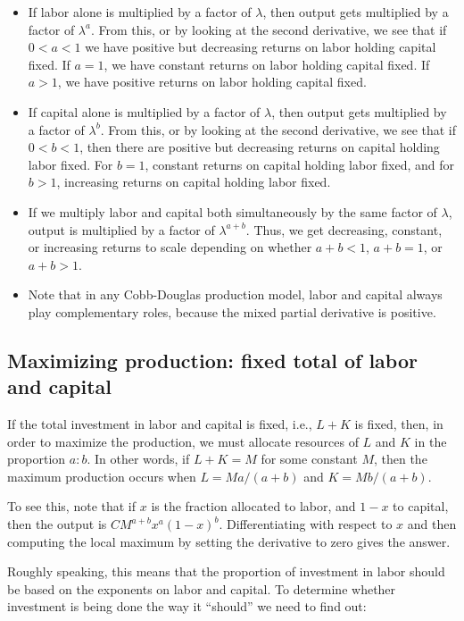 \documentclass[10pt]{amsart}
\begin{document}
\begin{itemize}
\item If labor alone is multiplied by a factor of $\lambda$, then
  output gets multiplied by a factor of $\lambda^a$. From this, or by
  looking at the second derivative, we see that if $0 < a < 1$ we have
  positive but decreasing returns on labor holding capital fixed. If
  $a = 1$, we have constant returns on labor holding capital fixed. If
  $a > 1$, we have positive returns on labor holding capital fixed.
\item If capital alone is multiplied by a factor of $\lambda$, then
  output gets multiplied by a factor of $\lambda^b$. From this, or by
  looking at the second derivative, we see that if $0 < b < 1$, then
  there are positive but decreasing returns on capital holding labor
  fixed. For $b = 1$, constant returns on capital holding labor fixed,
  and for $b > 1$, increasing returns on capital holding labor fixed.
\item If we multiply labor and capital both simultaneously by the same
  factor of $\lambda$, output is multiplied by a factor of
  $\lambda^{a+b}$. Thus, we get decreasing, constant, or increasing
  returns to scale depending on whether $a + b < 1$, $a + b = 1$, or
  $a + b > 1$.
\item Note that in any Cobb-Douglas production model, labor and
  capital always play complementary roles, because the mixed partial
  derivative is positive.
\end{itemize}

\subsection{Maximizing production: fixed total of labor and capital}

If the total investment in labor and capital is fixed, i.e., $L + K$
is fixed, then, in order to maximize the production, we must allocate
resources of $L$ and $K$ in the proportion $a:b$. In other words, if
$L + K = M$ for some constant $M$, then the maximum production occurs
when $L = Ma/(a + b)$ and $K = Mb/(a + b)$.

To see this, note that if $x$ is the fraction allocated to labor, and
$1 - x$ to capital, then the output is $CM^{a + b}x^a(1 -
x)^b$. Differentiating with respect to $x$ and then computing the
local maximum by setting the derivative to zero gives the answer.

Roughly speaking, this means that the proportion of investment in
labor should be based on the exponents on labor and capital. To
determine whether investment is being done the way it ``should'' we
need to find out:
\end{document}
